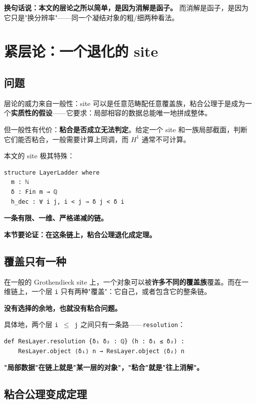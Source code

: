 \documentclass[11pt,a4paper]{ctexart}
\begin{document}
\textbf{换句话说：本文的层论之所以简单，是因为消解是函子。} 而消解是函子，是因为它只是"换分辨率"——同一个凝结对象的粗/细两种看法。

\bigskip

\section{紧层论：一个退化的 site}

\subsection{问题}

层论的威力来自一般性：site 可以是任意范畴配任意覆盖族，粘合公理于是成为一个\textbf{实质性的假设}——它要求：局部相容的数据总能唯一地拼成整体。

但一般性有代价：\textbf{粘合是否成立无法判定}。给定一个 site 和一族局部截面，判断它们能否粘合，一般需要计算上同调，而 \texttt{\ensuremath{H^{1}}} 通常不可计算。

本文的 site 极其特殊：

\begin{lstlisting}
structure LayerLadder where
  m : ℕ
  δ : Fin m → ℚ
  h_dec : ∀ i j, i < j → δ j < δ i
\end{lstlisting}

\textbf{一条有限、一维、严格递减的链。}

\textbf{本节要论证：在这条链上，粘合公理退化成定理。}

\subsection{覆盖只有一种}

在一般的 Grothendieck site 上，一个对象可以被\textbf{许多不同的覆盖族}覆盖。而在一维链上，一个层 \texttt{i} 只有两种"覆盖"：它自己，或者包含它的整条链。

\textbf{没有选择的余地，也就没有粘合问题。}

具体地，两个层 \texttt{i \ensuremath{\le} j} 之间只有一条路——\texttt{resolution}：

\begin{lstlisting}
def ResLayer.resolution {δ₁ δ₂ : ℚ} (h : δ₁ ≤ δ₂) :
    ResLayer.object ⟨δ₁⟩ n → ResLayer.object ⟨δ₂⟩ n
\end{lstlisting}

\textbf{"局部数据"在链上就是"某一层的对象"，"粘合"就是"往上消解"。}

\subsection{粘合公理变成定理}
\end{document}
